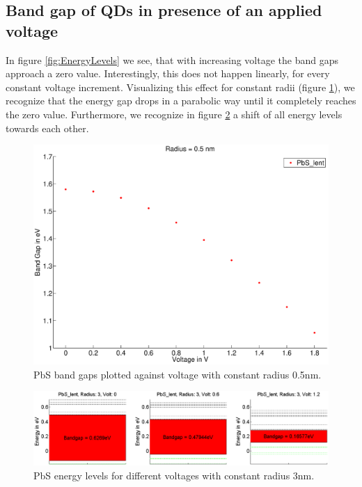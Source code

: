 \newpage
\subsection{Band gap of QDs in presence of an applied voltage}
	In figure \ref{fig:EnergyLevels} we see, that with increasing voltage the band gaps approach a zero value. Interestingly, this does not happen linearly, 
	for every constant voltage increment.	Visualizing this effect for constant radii (figure \ref{fig:BandGap_Volt}), we recognize that the energy gap drops
	in a	parabolic way until it completely reaches the zero value. Furthermore, we recognize in figure \ref{fig:EnergyLevels_Volt} a shift of all energy 
	levels towards each other.
	\begin{figure}
		\includegraphics[width=\textwidth]{Fig/Plots/BandGap_Volt.eps}
		\caption{PbS band gaps plotted against voltage with constant radius 0.5nm.}
		\label{fig:BandGap_Volt}
	\end{figure}
	\begin{figure}
		\includegraphics[width=\textwidth]{Fig/Plots/EnergyLevels.eps}
		\caption{PbS energy levels for different voltages with constant radius 3nm.}
		\label{fig:EnergyLevels_Volt}
	\end{figure}
	
